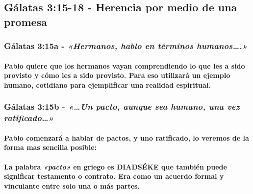 \documentclass[11a pt,twoside]{article}
\newcommand{\scripture}[1]{%
  {\fontsize{12pt}{16pt}\selectfont\ScriptureFont\itshape #1}%
}
\let\oldsubsection\subsection
\renewcommand{\subsection}{\needspace{5\baselineskip}\oldsubsection}
\let\oldsubsubsection\subsubsection
\renewcommand{\subsubsection}{\needspace{4\baselineskip}\oldsubsubsection}
\let\oldparagraph\paragraph
\renewcommand{\paragraph}{\needspace{3\baselineskip}\oldparagraph}
\begin{document}
\subsection{Gálatas 3:15-18 - Herencia por medio de una
promesa}\label{guxe1latas-315-18---herencia-por-medio-de-una-promesa}

\subsubsection{\texorpdfstring{Gálatas 3:15a -
\scripture{«Hermanos, hablo en términos humanos….»}}{Gálatas 3:15a - }}\label{guxe1latas-315a---hermanos-hablo-en-tuxe9rminos-humanos.}

\paragraph{Pablo quiere que los hermanos vayan comprendiendo lo que les
a sido provisto y cómo les a sido provisto. Para eso utilizará un
ejemplo humano, cotidiano para ejemplificar una realidad
espiritual.}\label{pablo-quiere-que-los-hermanos-vayan-comprendiendo-lo-que-les-a-sido-provisto-y-cuxf3mo-les-a-sido-provisto.-para-eso-utilizaruxe1-un-ejemplo-humano-cotidiano-para-ejemplificar-una-realidad-espiritual.}

\subsubsection{\texorpdfstring{Gálatas 3:15b -
\scripture{«…Un pacto, aunque sea humano, una vez ratificado…»}}{Gálatas 3:15b - }}\label{guxe1latas-315b---un-pacto-aunque-sea-humano-una-vez-ratificado}

\paragraph{Pablo comenzará a hablar de pactos, y uno ratificado, lo
veremos de la forma mas sencilla
posible:}\label{pablo-comenzaruxe1-a-hablar-de-pactos-y-uno-ratificado-lo-veremos-de-la-forma-mas-sencilla-posible}

\paragraph{\texorpdfstring{La palabra \scripture{«pacto»} en griego es
DIADSÉKE que también puede significar testamento o contrato. Era como un
acuerdo formal y vinculante entre solo una o más
partes.}{La palabra  en griego es DIADSÉKE que también puede significar testamento o contrato. Era como un acuerdo formal y vinculante entre solo una o más partes.}}\label{la-palabra-pacto-en-griego-es-diadsuxe9ke-que-tambiuxe9n-puede-significar-testamento-o-contrato.-era-como-un-acuerdo-formal-y-vinculante-entre-solo-una-o-muxe1s-partes.}
\end{document}
